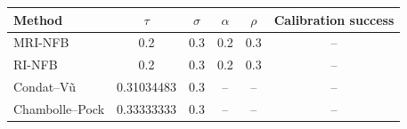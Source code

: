 \begin{tabular}{lccccc}\hline
Method & $\tau$ & $\sigma$ & $\alpha$ & $\rho$ & Calibration success \\
\hline
MRI-NFB & 0.2 & 0.3 & 0.2 & 0.3 & -- \\
RI-NFB & 0.2 & 0.3 & 0.2 & 0.3 & -- \\
Condat--V{\~u} & 0.31034483 & 0.3 & -- & -- & -- \\
Chambolle--Pock & 0.33333333 & 0.3 & -- & -- & -- \\
\hline\end{tabular}
